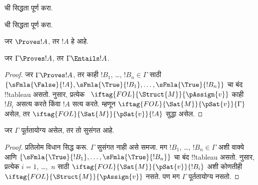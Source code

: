 \documentclass[../../../include/open-logic-section]{subfiles}
\begin{document}
\begin{prob}
 ची सिद्धता पूर्ण करा.
\end{prob}
\tagendprob

\begin{prob}
 ची सिद्धता पूर्ण करा.
\end{prob}
\tagendprob

\begin{cor}
जर $\Proves !A$, तर $!A$ हे  आहे.
\end{cor}

\begin{cor}
जर $\Gamma \Proves !A$, तर $\Gamma \Entails !A$.
\end{cor}

\begin{proof}
  जर $\Gamma \Proves !A$, तर काही $!B_1$, \dots, $!B_n \in
  \Gamma$ साठी $\{\sFmla{\False}{!A}, \sFmla{\True}{!B_1}, \dots,
  \sFmla{\True}{!B_n}\}$ चा बंद !!{tableau} असतो.
   नुसार, प्रत्येक
  ~$\iftag{FOL}{\Struct{M}}{\pAssign{v}}$
  काही $!B_i$ असत्य करते किंवा $!A$ सत्य करते. म्हणून
  $\iftag{FOL}{\Sat{M}}{\pSat{v}}{\Gamma}$ असेल, तर
  $\iftag{FOL}{\Sat{M}}{\pSat{v}}{!A}$ सुद्धा असेल.
\end{proof}

\begin{cor}
जर $\Gamma$ पूर्ततायोग्य असेल, तर तो सुसंगत आहे.
\end{cor}

\begin{proof}
प्रतिलोम विधान सिद्ध करू. $\Gamma$ सुसंगत नाही असे समजा. मग
$!B_1$, \dots, $!B_n \in \Gamma$ अशी वाक्ये आणि
$\{\sFmla{\True}{!B_1}, \dots, \sFmla{\True}{!B_n}\}$ चा बंद
!!{tableau} असतो.  नुसार, प्रत्येक
$i=1$, \dots,~$n$ साठी $\iftag{FOL}{\Sat{M}}{\pSat{v}}{!B_i}$ अशी
कोणतीही $\iftag{FOL}{\Struct{M}}{\pAssign{v}}$ नसते. पण मग $\Gamma$
पूर्ततायोग्य नसतो.
\end{proof}
\end{document}
